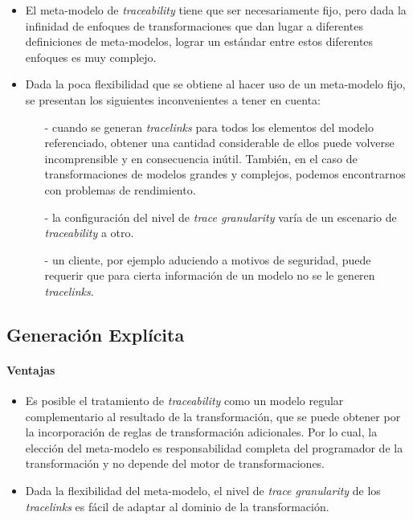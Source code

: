 \documentclass[a4paper,12pt,oneside,spanish]{book}
\begin{document}
\begin{itemize}[label={$\times$}]

\item El meta-modelo de \textit{traceability} tiene que ser necesariamente fijo, pero dada la infinidad de enfoques de transformaciones que dan lugar a diferentes definiciones de meta-modelos, lograr un estándar entre estos diferentes enfoques es muy complejo.

\item Dada la poca flexibilidad que se obtiene al hacer uso de un meta-modelo fijo, se presentan los siguientes inconvenientes a tener en cuenta:

\begin{itemize}

\item[-] cuando se generan \textit{tracelinks} para todos los elementos del modelo referenciado, obtener una cantidad considerable de ellos puede volverse incomprensible y en consecuencia inútil. También, en el caso de transformaciones de modelos grandes y complejos, podemos encontrarnos con problemas de rendimiento.

\item[-] la configuración del nivel de \textit{trace granularity} varía de un escenario de \textit{traceability} a otro.

\item[-] un cliente, por ejemplo aduciendo a motivos de seguridad, puede requerir que para cierta información de un modelo no se le generen \textit{tracelinks}.

\end{itemize}

\end{itemize}

\subsection{Generación Explícita}

\paragraph{Ventajas}

\begin{itemize}[label={\checkmark}]

\item Es posible el tratamiento de \textit{traceability} como un modelo regular complementario al resultado de la transformación, que se puede obtener por la incorporación de reglas de transformación adicionales. Por lo cual, la elección del meta-modelo es responsabilidad completa del programador de la transformación y no depende del motor de transformaciones. 

\item Dada la flexibilidad del meta-modelo, el nivel de \textit{trace granularity} de los \textit{tracelinks} es fácil de adaptar al dominio de la transformación.

\end{itemize}
\end{document}
